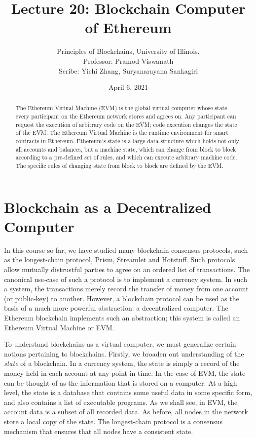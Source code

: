 \documentclass{article}
\title{Lecture 20: Blockchain Computer of Ethereum}
\author{Principles of Blockchains, University of Illinois,  \\ Professor:  Pramod Viswanath \\ Scribe: Yichi Zhang, Suryanarayana Sankagiri}
\date{April 6, 2021}
\begin{document}
\maketitle

\begin{abstract}
The Ethereum Virtual Machine (EVM) is the global virtual computer whose state every participant on the Ethereum network stores and agrees on. Any participant can request the execution of arbitrary code on the EVM; code execution changes the state of the EVM. The Ethereum Virtual Machine is the runtime environment for smart contracts in Ethereum. Ethereum's state is a large data structure which holds not only all accounts and balances, but a machine state, which can change from block to block according to a pre-defined set of rules, and which can execute arbitrary machine code. The specific rules of changing state from block to block are defined by the EVM.
\end{abstract}


\section*{Blockchain as a Decentralized Computer}
In this course so far, we have studied many blockchain consensus protocols, such as the longest-chain protocol, Prism, Streamlet and Hotstuff. Such protocols allow mutually distrustful parties to agree on an ordered list of transactions. The canonical use-case of such a protocol is to implement a currency system. In such a system, the transactions merely record the transfer of money from one account (or public-key) to another. However, a blockchain protocol can be used as the basis of a much more powerful abstraction: a decentralized computer. The Ethereum blockchain implements such an abstraction; this system is called an Ethereum Virtual Machine or EVM.

To understand blockchains as a virtual computer, we must generalize certain notions pertaining to blockchains. Firstly, we broaden out understanding of the \textit{state} of a blockchain. In a currency system, the state is simply a record of the money held in each account at any point in time. In the case of EVM, the state can be thought of as the information that is stored on a computer. At a high level, the state is a database that contains some useful data in some specific form, and also contains a list of executable programs. As we shall see, in EVM, the account data is a subset of all recorded data. As before, all nodes in the network store a local copy of the state. The longest-chain protocol is a consensus mechanism that ensures that all nodes have a consistent state.
\end{document}

